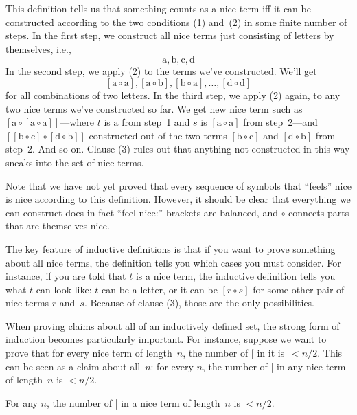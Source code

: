 \documentclass[../../../include/open-logic-section]{subfiles}
\begin{document}
This definition tells us that something counts as a nice term iff it
can be constructed according to the two conditions (1) and~(2) in some
finite number of steps. In the first step, we construct all nice terms
just consisting of letters by themselves, i.e.,
\[
\mathrm{a}, \mathrm{b}, \mathrm{c}, \mathrm{d}
\]
In the second step, we apply (2) to the terms we've constructed. We'll get
\[
[\mathrm{a} \circ \mathrm{a}], [\mathrm{a} \circ \mathrm{b}],
[\mathrm{b} \circ \mathrm{a}], \dots, [\mathrm{d} \circ \mathrm{d}]
\]
for all combinations of two letters. In the third step, we apply (2)
again, to any two nice terms we've constructed so far. We get new nice
term such as $[\mathrm{a} \circ [\mathrm{a} \circ
    \mathrm{a}]]$---where $t$ is $\mathrm{a}$ from step~1 and $s$ is
$[\mathrm{a} \circ \mathrm{a}]$ from step~2---and $[[\mathrm{b} \circ
    \mathrm{c}] \circ [\mathrm{d} \circ \mathrm{b}]]$ constructed out
of the two terms $[\mathrm{b} \circ \mathrm{c}]$ and $[\mathrm{d}
  \circ \mathrm{b}]$ from step~2. And so on.  Clause (3) rules out
that anything not constructed in this way sneaks into the set of nice
terms.

Note that we have not yet proved that every sequence of symbols that
``feels'' nice is nice according to this definition. However, it
should be clear that everything we can construct does in fact ``feel
nice:'' brackets are balanced, and $\circ$ connects parts that are
themselves nice.

The key feature of inductive definitions is that if you want to prove
something about all nice terms, the definition tells you which cases
you must consider.  For instance, if you are told that $t$ is a nice
term, the inductive definition tells you what $t$ can look like: $t$
can be a letter, or it can be $[r \circ s]$ for some other pair of
nice terms $r$ and~$s$. Because of clause (3), those are the only
possibilities.

When proving claims about all of an inductively defined set, the
strong form of induction becomes particularly important. For instance,
suppose we want to prove that for every nice term of length~$n$, the
number of $[$ in it is~$< n/2$.  This can be seen as a claim about
all~$n$: for every $n$, the number of $[$ in any nice term of
length~$n$ is $< n/2$.

\begin{prop}
  For any $n$, the number of $[$ in a nice term of length~$n$ is
  $< n/2$.
\end{prop}
\end{document}
